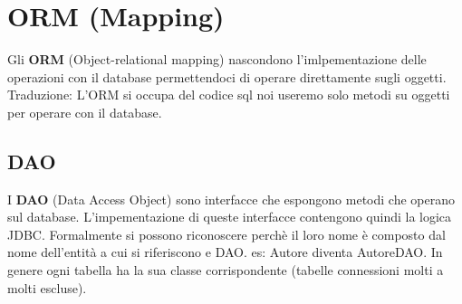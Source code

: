 \documentclass[11pt, letterpaper, titlepage]{article}
\begin{document}
\section{ORM (Mapping)}
Gli \textbf{ORM} (Object-relational mapping) nascondono l'imlpementazione delle operazioni con il database permettendoci di operare
direttamente sugli oggetti. Traduzione: L'ORM si occupa del codice sql noi useremo solo metodi su oggetti per operare con
il database.

\subsection{DAO}
I \textbf{DAO} (Data Access Object) sono interfacce che espongono metodi che operano sul database.
L'impementazione di queste interfacce contengono quindi la logica JDBC.
Formalmente si possono riconoscere perchè il loro nome è composto dal nome dell'entità a cui si
riferiscono e DAO. es: Autore diventa AutoreDAO. In genere ogni tabella ha la sua classe corrispondente
(tabelle connessioni molti a molti escluse).
\end{document}
